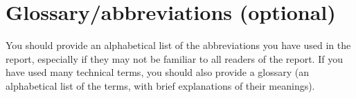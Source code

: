 \chapter*{Glossary/abbreviations (optional)}
You should provide an alphabetical list of the abbreviations you have used in the report, especially if they may not be familiar to all readers of the report. If you have used many technical terms, you should also provide a glossary (an alphabetical list of the terms, with brief explanations of their meanings).
